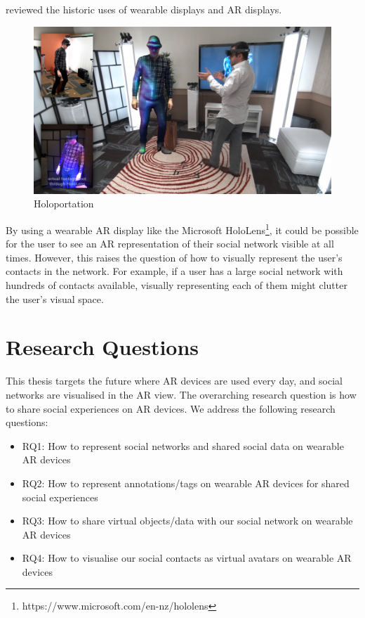\cite{Peddie2017} reviewed the historic uses of wearable displays and AR displays. 

\begin{figure}
    \centering
    \includegraphics[width=.8\linewidth]{images/holoportation.png}
    \caption{Holoportation}
    \label{fig:holoportation}
\end{figure}

By using a wearable AR display like the Microsoft HoloLens\footnote{https://www.microsoft.com/en-nz/hololens}, it could be possible for the user to see an AR representation of their social network visible at all times. However, this raises the question of how to visually represent the user's contacts in the network. For example, if a user has a large social network with hundreds of contacts available, visually representing each of them might clutter the user's visual space.

\section{Research Questions}

This thesis targets the future where AR devices are used every day, and social networks are visualised in the AR view. The overarching research question is how to share social experiences on AR devices. We address the following research questions: 

\begin{itemize}
    \item {RQ1: How to represent social networks and shared social data on wearable AR devices}
    
    \item{RQ2: How to represent annotations/tags on wearable AR devices for shared social experiences}
    
    \item{RQ3: How to share virtual objects/data with our social network on wearable AR devices}
    
    \item{RQ4: How to visualise our social contacts as virtual avatars on wearable AR devices}

\end{itemize}

